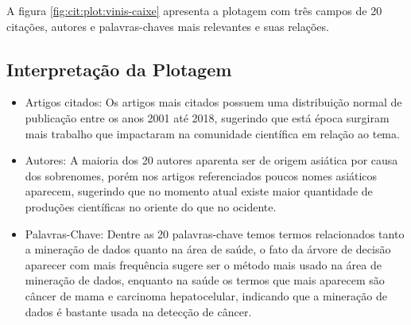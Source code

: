 A figura \ref{fig:cit:plot:vinis-caixe} apresenta a plotagem com três campos de 20 citações, autores e palavras-chaves mais relevantes e suas relações.

\subsection{Interpretação da Plotagem}

\begin{itemize}
    \item Artigos citados: Os artigos mais citados possuem uma distribuição normal de publicação entre os anos 2001 até 2018, sugerindo que está época surgiram mais trabalho que impactaram na comunidade científica em relação ao tema.
    \item Autores: A maioria dos 20 autores aparenta ser de origem asiática por causa dos sobrenomes, porém nos artigos referenciados poucos nomes asiáticos aparecem, sugerindo que no momento atual existe maior quantidade de produções científicas no oriente do que no ocidente.
    \item Palavras-Chave: Dentre as 20 palavras-chave temos termos relacionados tanto a mineração de dados quanto na área de saúde, o fato da árvore de decisão aparecer com mais frequência sugere ser o método mais usado na área de mineração de dados, enquanto na saúde os termos que mais aparecem são câncer de mama e carcinoma hepatocelular, indicando que a mineração de dados é bastante usada na detecção de câncer.
\end{itemize}